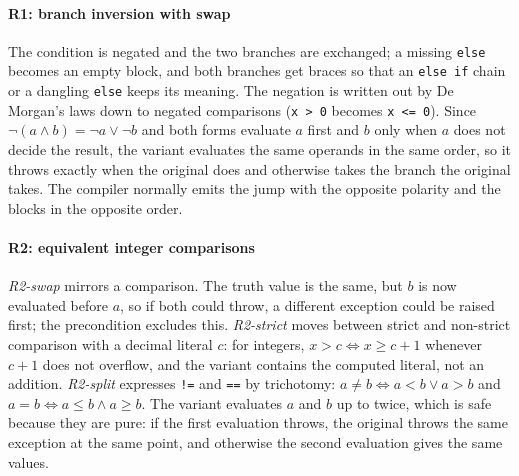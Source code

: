 \paragraph{R1: branch inversion with swap}
The condition is negated and the two branches are exchanged; a missing
\texttt{else} becomes an empty block, and both branches get braces so that an
\texttt{else if} chain or a dangling \texttt{else} keeps its meaning. The
negation is written out by De Morgan's laws down to negated comparisons
(\texttt{x > 0} becomes \texttt{x <= 0}). Since $\lnot(a \land b) = \lnot a \lor
\lnot b$ and both forms evaluate $a$ first and $b$ only when $a$ does not decide
the result, the variant evaluates the same operands in the same order, so it
throws exactly when the original does and otherwise takes the branch the
original takes. The compiler normally emits the jump with the opposite polarity
and the blocks in the opposite order.

\paragraph{R2: equivalent integer comparisons}
\emph{R2-swap} mirrors a comparison. The truth value is the same, but $b$ is
now evaluated before $a$, so if both could throw, a different exception could
be raised first; the precondition excludes this. \emph{R2-strict} moves between
strict and non-strict comparison with a decimal literal $c$: for integers,
$x > c \iff x \ge c+1$ whenever $c+1$ does not overflow, and the variant
contains the computed literal, not an addition. \emph{R2-split} expresses
\texttt{!=} and \texttt{==} by trichotomy: $a \ne b \iff a<b \lor a>b$ and
$a = b \iff a\le b \land a\ge b$. The variant evaluates $a$ and $b$ up to
twice, which is safe because they are pure: if the first evaluation throws, the
original throws the same exception at the same point, and otherwise the second
evaluation gives the same values.

